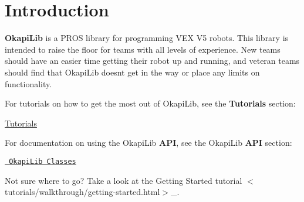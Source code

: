 \hypertarget{index_intro_sec}{}\section{Introduction}\label{index_intro_sec}
{\bfseries{Okapi\+Lib}} is a P\+R\+OS library for programming V\+EX V5 robots. This library is intended to raise the floor for teams with all levels of experience. New teams should have an easier time getting their robot up and running, and veteran teams should find that Okapi\+Lib doesn\textquotesingle{}t get in the way or place any limits on functionality.

For tutorials on how to get the most out of Okapi\+Lib, see the {\bfseries{Tutorials}} section\+:

\mbox{\hyperlink{md_doc_Tutorial1}{Tutorials}}

For documentation on using the Okapi\+Lib {\bfseries{A\+PI}}, see the Okapi\+Lib {\bfseries{A\+PI}} section\+:

\href{annotated.html}{\texttt{ Okapi\+Lib Classes}}

Not sure where to go? Take a look at the {\ttfamily Getting Started tutorial $<$tutorials/walkthrough/getting-\/started.\+html$>$}\+\_\+. 